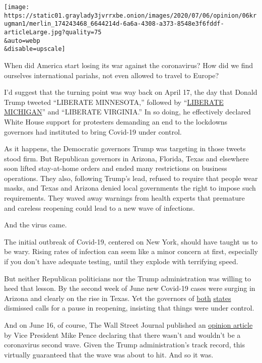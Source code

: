 \texttt{[image: https://static01.graylady3jvrrxbe.onion/images/2020/07/06/opinion/06krugman1/merlin\_174243468\_6644214d-6a6a-4308-a373-8548e3f6fddf-articleLarge.jpg?quality=75\\\&auto=webp\\\&disable=upscale]}

When did America start losing its war against the coronavirus? How did
we find ourselves international pariahs, not even allowed to travel to
Europe?

I'd suggest that the turning point was way back on April 17, the day
that Donald Trump tweeted ``LIBERATE MINNESOTA,'' followed by
``\href{https://www.detroitnews.com/story/news/politics/2020/04/17/trump-tweets-liberate-michigan-other-states-democratic-governors/5152037002/}{LIBERATE
MICHIGAN}'' and ``LIBERATE VIRGINIA.'' In so doing, he effectively
declared White House support for protesters demanding an end to the
lockdowns governors had instituted to bring Covid-19 under control.

As it happens, the Democratic governors Trump was targeting in those
tweets stood firm. But Republican governors in Arizona, Florida, Texas
and elsewhere soon lifted stay-at-home orders and ended many
restrictions on business operations. They also, following Trump's lead,
refused to require that people wear masks, and Texas and Arizona denied
local governments the right to impose such requirements. They waved away
warnings from health experts that premature and careless reopening could
lead to a new wave of infections.

And the virus came.

The initial outbreak of Covid-19, centered on New York, should have
taught us to be wary. Rising rates of infection can seem like a minor
concern at first, especially if you don't have adequate testing, until
they explode with terrifying speed.

But neither Republican politicians nor the Trump administration was
willing to heed that lesson. By the second week of June new Covid-19
cases were surging in Arizona and clearly on the rise in Texas. Yet the
governors of
\href{https://www.texastribune.org/2020/06/12/texas-coronavirus-reopening-cases/}{both}
\href{https://www.bizjournals.com/phoenix/news/2020/06/11/arizona-keep-reopening-despite-covid-19-surge.html}{states}
dismissed calls for a pause in reopening, insisting that things were
under control.

And on June 16, of course, The Wall Street Journal published an
\href{https://www.wsj.com/articles/there-isnt-a-coronavirus-second-wave-11592327890}{opinion
article} by Vice President Mike Pence declaring that there wasn't and
wouldn't be a coronavirus second wave. Given the Trump administration's
track record, this virtually guaranteed that the wave was about to hit.
And so it was.

